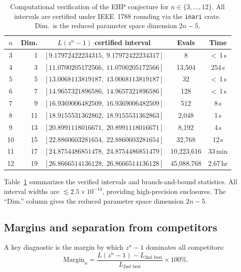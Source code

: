 \documentclass[11pt]{article}
\theoremstyle{plain}
\theoremstyle{definition}
\theoremstyle{remark}
\begin{document}
\begin{table}[ht]
\centering
\caption{Computational verification of the EHP conjecture for $n \in \{3, \ldots, 12\}$. All intervals are certified under IEEE~1788 rounding via the \texttt{inari} crate. Dim.\ is the reduced parameter space dimension $2n-5$.}
\label{tab:results}
\small
\begin{tabular}{crccc}
\toprule
$n$ & \textbf{Dim.} & $L(z^n-1)$ \textbf{certified interval} & \textbf{Evals} & \textbf{Time} \\
\midrule
3 & 1 & $[9.17972422234315,\; 9.17972422234317]$ & 8 & $<$\,1\,s \\
4 & 3 & $[11.0700205172566,\; 11.0700205172566]$ & 13{,}504 & 254\,s \\
5 & 5 & $[13.0068113819187,\; 13.0068113819187]$ & 32 & $<$\,1\,s \\
6 & 7 & $[14.9657321896586,\; 14.9657321896586]$ & 128 & $<$\,1\,s \\
7 & 9 & $[16.9369006482509,\; 16.9369006482509]$ & 512 & 8\,s \\
8 & 11 & $[18.9155531362862,\; 18.9155531362863]$ & 2{,}048 & 1\,s \\
9 & 13 & $[20.8991118016671,\; 20.8991118016671]$ & 8{,}192 & 4\,s \\
10 & 15 & $[22.8860603281654,\; 22.8860603281654]$ & 32{,}768 & 12\,s \\
11 & 17 & $[24.8754486851478,\; 24.8754486851479]$ & 10{,}223{,}616 & 33\,min \\
12 & 19 & $[26.8666514136128,\; 26.8666514136128]$ & 45{,}088{,}768 & 2.67\,hr \\
\bottomrule
\end{tabular}
\end{table}

Table~\ref{tab:results} summarizes the verified intervals and branch-and-bound statistics. All interval widths are $\lesssim 2.5 \times 10^{-14}$, providing high-precision enclosures. The ``Dim.'' column gives the reduced parameter space dimension $2n - 5$.

\subsection{Margins and separation from competitors}

A key diagnostic is the margin by which $z^n - 1$ dominates all competitors:
\[
\mathrm{Margin}_n = \frac{L(z^n - 1) - L_{\text{2nd best}}}{L_{\text{2nd best}}} \times 100\%.
\]
\end{document}
